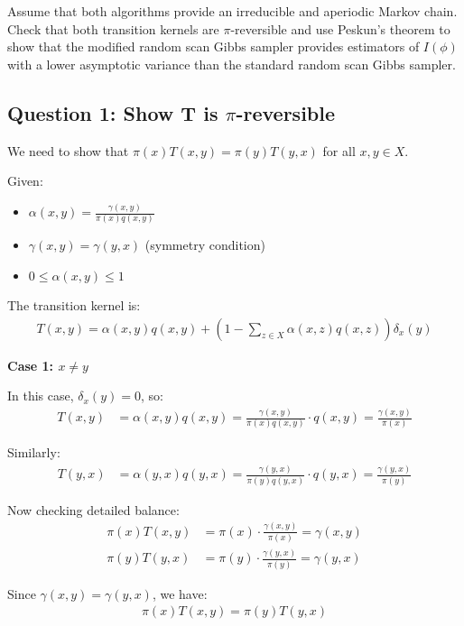 \begin{enumerate}
Assume that both algorithms provide an irreducible and aperiodic Markov chain. Check that both transition kernels are $\pi$-reversible and use Peskun's theorem to show that the modified random scan Gibbs sampler provides estimators of $I (\phi)$ with a lower asymptotic variance than the standard random scan Gibbs sampler.
\end{enumerate}

\subsection*{Question 1: Show T is $\pi$-reversible}

We need to show that $\pi(x)T(x,y) = \pi(y)T(y,x)$ for all $x,y \in X$.

Given:
\begin{itemize}
\item $\alpha(x,y) = \frac{\gamma(x,y)}{\pi(x)q(x,y)}$
\item $\gamma(x,y) = \gamma(y,x)$ (symmetry condition)
\item $0 \leq \alpha(x,y) \leq 1$
\end{itemize}

The transition kernel is:
\begin{align*}
T(x,y) = \alpha(x,y)q(x,y) + \left(1 - \sum_{z \in X} \alpha(x,z)q(x,z)\right)\delta_x(y)
\end{align*}

\textbf{Case 1: $x \neq y$}

In this case, $\delta_x(y) = 0$, so:
\begin{align*}
T(x,y) &= \alpha(x,y)q(x,y) = \frac{\gamma(x,y)}{\pi(x)q(x,y)} \cdot q(x,y) = \frac{\gamma(x,y)}{\pi(x)}
\end{align*}

Similarly:
\begin{align*}
T(y,x) &= \alpha(y,x)q(y,x) = \frac{\gamma(y,x)}{\pi(y)q(y,x)} \cdot q(y,x) = \frac{\gamma(y,x)}{\pi(y)}
\end{align*}

Now checking detailed balance:
\begin{align*}
\pi(x)T(x,y) &= \pi(x) \cdot \frac{\gamma(x,y)}{\pi(x)} = \gamma(x,y)\\
\pi(y)T(y,x) &= \pi(y) \cdot \frac{\gamma(y,x)}{\pi(y)} = \gamma(y,x)
\end{align*}

Since $\gamma(x,y) = \gamma(y,x)$, we have:
\begin{align*}
\pi(x)T(x,y) = \pi(y)T(y,x)
\end{align*}

